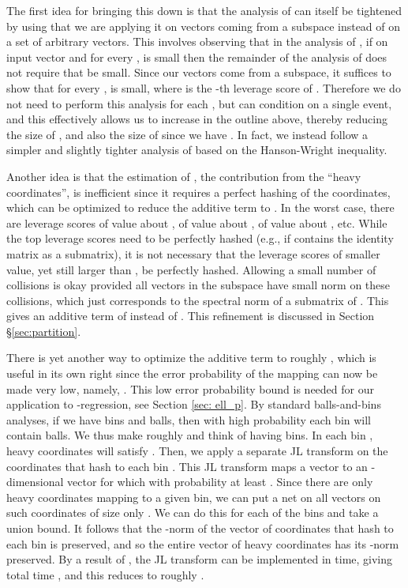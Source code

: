 \documentclass{sig-alternate}
\begin{document}
The first idea
for bringing this down is that the analysis of \cite{dks10} can itself 
be tightened by using that we are applying it on vectors coming 
from a subspace instead of on a set of arbitrary vectors. This involves observing that in the analysis of \cite{dks10}, if on
input vector  and for every ,  is small then the remainder of the analysis of \cite{dks10}
does not require that  be small. Since our vectors come from a subspace, it suffices to show that for every , 
 is small, where  is the -th leverage score of . Therefore we do not
need to perform this analysis for each , but can condition on a single event, and this effectively allows us to 
increase  in the outline above, thereby reducing the size of , and also the size of  since we have
. In fact, we instead follow a simpler and slightly tighter analysis of \cite{KN12} based on the Hanson-Wright
inequality. 

Another idea is that the estimation of , the contribution from the 
``heavy coordinates'', is inefficient since it
requires a perfect hashing of the coordinates, which can be optimized to reduce the
additive term to . In the worst case, there are  leverage scores of value
about ,  of value about ,  of value about , etc. While the top  leverage
scores need to be perfectly hashed (e.g., if  contains the  identity matrix as a
submatrix), it is not necessary that the leverage scores of smaller value, yet still larger than ,
be perfectly hashed. Allowing a small number of collisions is okay provided all vectors in the subspace have
small norm on these collisions, which just corresponds to the spectral norm of a submatrix of . This 
gives an additive term of  instead of . 
This refinement is discussed in Section \S\ref{sec:partition}.

There is yet another way to optimize the additive term to roughly , which is useful in its own
right since the error probability of the mapping can now be made very low, namely, . This low error
probability bound is needed for our application to -regression, see Section \ref{sec: ell_p}.
By standard balls-and-bins analyses, if we have  bins and  balls, then with 
high probability each bin will contain  balls. We thus make  roughly  and think
of having  bins. In each bin ,  heavy coordinates  
will satisfy .
Then, we apply a separate JL transform on the coordinates that hash to each bin . 
This JL
transform maps a vector  to an -dimensional vector  for which
 with probability at least . Since there are only 
heavy coordinates mapping to a given bin, we can put a net on all vectors on such coordinates of size only 
. We can do this for each of the 
 bins and take a union bound. It follows 
that the -norm of the vector of coordinates that hash to each bin is preserved, and so the entire
vector  of heavy coordinates has its -norm preserved. By a result of \cite{KN12}, 
the JL
transform can be implemented in  time, giving total time , and
this reduces  to roughly . 
\end{document}
